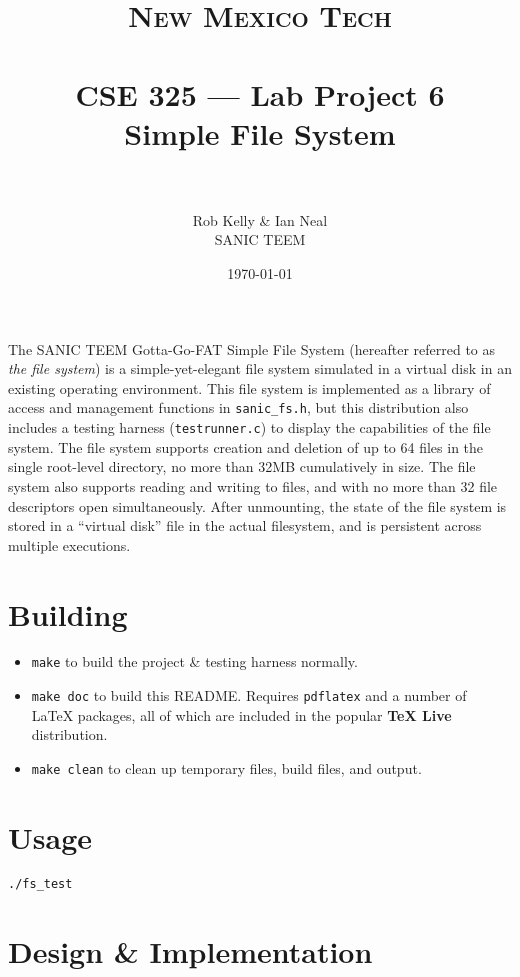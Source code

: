 \documentclass[paper=a4, fontsize=11pt]{scrartcl}
\title{
  \normalfont \normalsize 
  \textsc{New Mexico Tech} \\ [25pt]
  \horrule{0.5pt} \\[0.4cm]
  \huge CSE 325 --- Lab Project 6 \\ Simple File System \\
  \horrule{2pt} \\[0.5cm]
}
\author{Rob Kelly \& Ian Neal \\ SANIC TEEM}
\date{\normalsize\today}
\begin{document}
\maketitle

The SANIC TEEM Gotta-Go-FAT Simple File System (hereafter referred to as \textit{the file system}) is a simple-yet-elegant file system simulated in a virtual disk in an existing operating environment. This file system is implemented as a library of access and management functions in \texttt{sanic\_fs.h}, but this distribution also includes a testing harness (\texttt{testrunner.c}) to display the capabilities of the file system. The file system supports creation and deletion of up to 64 files in the single root-level directory, no more than 32MB cumulatively in size. The file system also supports reading and writing to files, and with no more than 32 file descriptors open simultaneously. After unmounting, the state of the file system is stored in a ``virtual disk'' file in the actual filesystem, and is persistent across multiple executions.

\section*{Building}
\begin{itemize}
  \item \texttt{make} to build the project \& testing harness normally.

  \item \texttt{make doc} to build this README. Requires \texttt{pdflatex} and a number of \LaTeX\hspace{0em} packages, all of which are included in the popular \textbf{TeX Live} distribution.

  \item \texttt{make clean} to clean up temporary files, build files, and output.
\end{itemize} 

\section*{Usage}
\texttt{./fs\_test}

\section*{Design \& Implementation}
\end{document}
